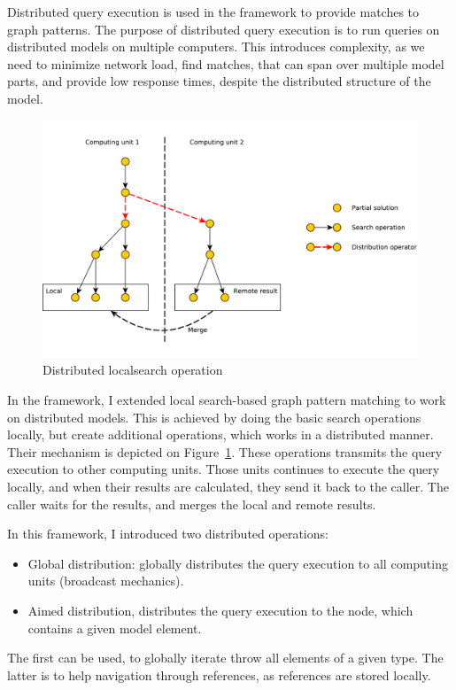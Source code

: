 Distributed query execution is used in the framework to provide matches to graph patterns.
The purpose of distributed query execution is to run queries on distributed models on multiple computers. 
This introduces complexity, as we need to minimize network load, find matches, that can span over multiple model parts, and provide low response times, despite the distributed structure of the model.


\begin{figure}[h]
	\begin{center}
		\includegraphics[width=\textwidth]{figures/distributed-ls.pdf}
		\caption{Distributed localsearch operation}
		\label{fig:distributed-ls}
	\end{center}
\end{figure}

In the framework, I extended local search-based graph pattern matching to work on distributed models.
This is achieved by doing the basic search operations locally, but create additional operations, which works in a distributed manner. 
Their mechanism is depicted on Figure~\ref{fig:distributed-ls}.
These operations transmits the query execution to other computing units.
Those units continues to execute the query locally, and when their results are calculated, they send it back to the caller.
The caller waits for the results, and merges the local and remote results.

In this framework, I introduced two distributed operations:
\begin{itemize}
	\item Global distribution: globally distributes the query execution to all computing units (broadcast mechanics).
	\item Aimed distribution, distributes the query execution to the node, which contains a given model element.
\end{itemize}

The first can be used, to globally iterate throw all elements of a given type. The latter is to help navigation through references, as references are stored locally.





